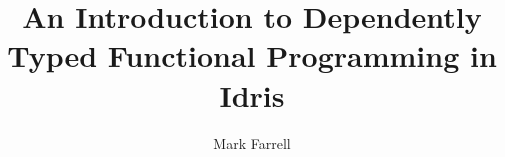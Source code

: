 \documentclass{beamer}
\title{An Introduction to Dependently Typed Functional Programming in Idris}
\author{Mark Farrell}
\begin{document}
  \frame{\titlepage}
  
  
  
  
  
  
  
  
  
  
  
\end{document}
